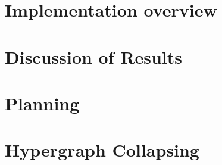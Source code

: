 \documentclass[Master.tex]{subfiles}
\begin{document}
\section{Implementation overview}
    

\section{Discussion of Results}
    

\section{Planning}
    

\section{Hypergraph Collapsing}
    
\end{document}
